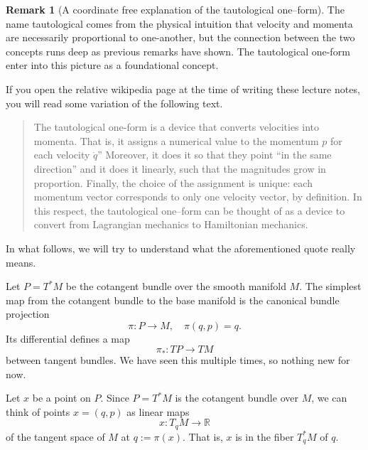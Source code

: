 \documentclass[english,fontsize=11pt,paper=b5]{scrbook}
\numberwithin{equation}{chapter}
\theoremstyle{definition}
\newtheorem{remark}{Remark}[chapter]
\begin{document}
    \begin{remark}[A coordinate free explanation of the tautological one--form]
      The name tautological comes from the physical intuition that velocity and momenta are necessarily proportional to one-another, but the connection between the two concepts runs deep as previous remarks have shown.
      The tautological one-form enter into this picture as a foundational concept.

      If you open the relative wikipedia page at the time of writing these lecture notes, you will read some variation of the following text.
      \begin{quote}
        The tautological one-form is a device that converts velocities into momenta.
        That is, it assigns a numerical value to the momentum $p$ for each velocity $\dot {q}$''
        Moreover, it does it so that they point ``in the same direction'' and it does it linearly, such that the magnitudes grow in proportion.
        Finally, the choice of the assignment is unique: each momentum vector corresponds to only one velocity vector, by definition.
        In this respect, the tautological one--form can be thought of as a device to convert from Lagrangian mechanics to Hamiltonian mechanics.
      \end{quote}
      In what follows, we will try to understand what the aforementioned quote really means.

      Let $P = T^* M$ be the cotangent bundle over the smooth manifold $M$.
      The simplest map from the cotangent bundle to the base manifold is the canonical bundle projection
      \begin{equation}
        \pi :P\to M,\quad \pi(q,p) = q.
      \end{equation}
      Its differential defines a map
      \begin{equation}
        \pi_* : TP \to TM
      \end{equation}
      between tangent bundles.
      We have seen this multiple times, so nothing new for now.

      Let $x$ be a point on $P$.
      Since $P = T^*M$ is the cotangent bundle over $M$, we can think of points $x = (q,p)$ as linear maps
      \begin{equation}
        x : T_q M \to \mathbb{R}
      \end{equation}
      of the tangent space of $M$ at $q := \pi(x)$.
      That is, $x$ is in the fiber $T^*_qM$ of $q$.


\end{remark}
\end{document}

